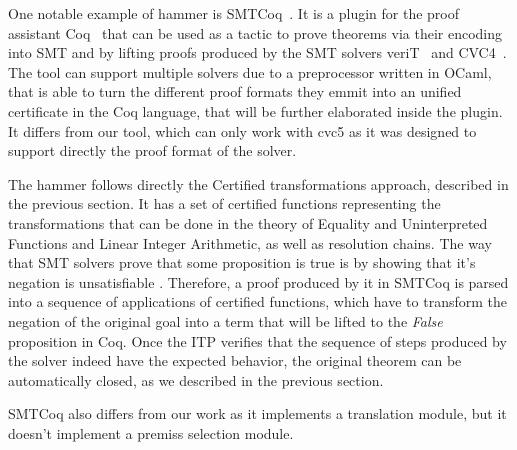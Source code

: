One notable example of hammer is SMTCoq~\cite{smtcoq}.
It is a plugin for the proof assistant Coq~\cite{Bertot2004} that
can be used as a tactic to prove theorems via their encoding into
SMT and by lifting proofs produced by the SMT solvers veriT~\cite{Bouton2009}
and CVC4~\cite{Barrett2011}. The tool can support multiple solvers
due to a preprocessor written in OCaml, that is able to turn the different
proof formats they emmit into an unified certificate in the Coq language,
that will be further elaborated inside the plugin. It differs from our tool,
which can only work with cvc5 as it was designed to support directly the proof
format of the solver.

The hammer follows directly the Certified transformations approach, described in
the previous section. It has a set of certified functions representing the transformations
that can be done in the theory of Equality and Uninterpreted Functions and
Linear Integer Arithmetic, as well as resolution chains. The way that SMT solvers prove
that some proposition is true is by showing that it's negation is unsatisfiable
. Therefore, a proof
produced by it in SMTCoq is parsed into a sequence of applications of certified
functions, which have to transform the negation of the original goal into a
term that will be lifted to the \textit{False} proposition in Coq. Once the
ITP verifies that the sequence of steps produced by the solver indeed
have the expected behavior, the original theorem can be automatically closed,
as we described in the previous section.

SMTCoq also differs from our work as it implements a translation module, but
it doesn't implement a premiss selection module.
